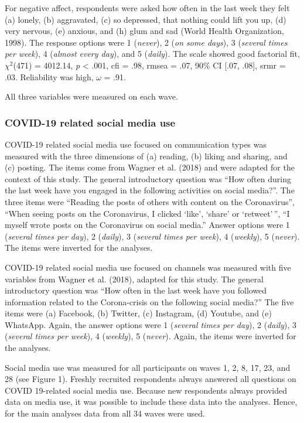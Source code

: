 \documentclass[
  man,mask,floatsintext]{apa7}
\begin{document}
For negative affect, respondents were asked how often in the last week they felt (a) lonely, (b) aggravated, (c) so depressed, that nothing could lift you up, (d) very nervous, (e) anxious, and (h) glum and sad (World Health Organization, 1998).
The response options were 1 (\emph{never}), 2 (\emph{on some days}), 3 (\emph{several times per week}), 4 (\emph{almost every day}), and 5 (\emph{daily}).
The scale showed good factorial fit, \(\chi^2\)(471) = 4012.14, \textit{p} \textless{} .001, cfi = .98, rmsea = .07, 90\% CI {[}.07, .08{]}, srmr = .03.
Reliability was high, \(\omega\) = .91.

All three variables were measured on each wave.

\subsubsection{COVID-19 related social media use}\label{covid-19-related-social-media-use}

COVID-19 related social media use focused on communication types was measured with the three dimensions of (a) reading, (b) liking and sharing, and (c) posting.
The items come from Wagner et al. (2018) and were adapted for the context of this study.
The general introductory question was ``How often during the last week have you engaged in the following activities on social media?''.
The three items were ``Reading the posts of others with content on the Coronavirus'', ``When seeing posts on the Coronavirus, I clicked `like', `share' or `retweet'\,'', ``I myself wrote posts on the Coronavirus on social media.''
Answer options were 1 (\emph{several times per day}), 2 (\emph{daily}), 3 (\emph{several times per week}), 4 (\emph{weekly}), 5 (\emph{never}).
The items were inverted for the analyses.

COVID-19 related social media use focused on channels was measured with five variables from Wagner et al. (2018), adapted for this study.
The general introductory question was ``How often in the last week have you followed information related to the Corona-crisis on the following social media?''
The five items were (a) Facebook, (b) Twitter, (c) Instagram, (d) Youtube, and (e) WhatsApp.
Again, the answer options were 1 (\emph{several times per day}), 2 (\emph{daily}), 3 (\emph{several times per week}), 4 (\emph{weekly}), 5 (\emph{never}).
Again, the items were inverted for the analyses.

Social media use was measured for all participants on waves 1, 2, 8, 17, 23, and 28 (see Figure 1).
Freshly recruited respondents always answered all questions on COVID 19-related social media use.
Because new respondents always provided data on media use, it was possible to include these data into the analyses.
Hence, for the main analyses data from all 34 waves were used.
\end{document}
